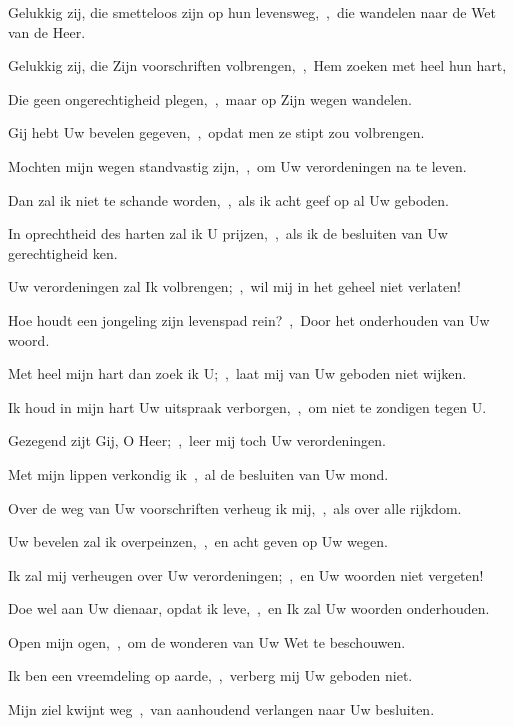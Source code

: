 \documentclass[12pt,twoside,a5paper]{article}
\begin{document}
\begin{halfparskip}

   Gelukkig zij, die smetteloos zijn op hun levensweg,~\sep\ die wandelen naar de Wet van de Heer.


  Gelukkig zij, die Zijn voorschriften volbrengen,~\sep\ Hem zoeken met heel hun hart,

  Die geen ongerechtigheid plegen,~\sep\ maar op Zijn wegen wandelen.

  Gij hebt Uw bevelen gegeven,~\sep\ opdat men ze stipt zou volbrengen.

  Mochten mijn wegen standvastig zijn,~\sep\ om Uw verordeningen na te leven.

  Dan zal ik niet te schande worden,~\sep\ als ik acht geef op al Uw geboden.

  In oprechtheid des harten zal ik U prijzen,~\sep\ als ik de besluiten van Uw gerechtigheid ken.

  Uw verordeningen zal Ik volbrengen;~\sep\ wil mij in het geheel niet verlaten!

   Hoe houdt een jongeling zijn levenspad rein?~\sep\ Door het onderhouden van Uw woord.

  Met heel mijn hart dan zoek ik U;~\sep\ laat mij van Uw geboden niet wijken.

  Ik houd in mijn hart Uw uitspraak verborgen,~\sep\ om niet te zondigen tegen U.

  Gezegend zijt Gij, O Heer;~\sep\ leer mij toch Uw verordeningen.

  Met mijn lippen verkondig ik~\sep\ al de besluiten van Uw mond.

  Over de weg van Uw voorschriften verheug ik mij,~\sep\ als over alle rijkdom.

  Uw bevelen zal ik overpeinzen,~\sep\ en acht geven op Uw wegen.

  Ik zal mij verheugen over Uw verordeningen;~\sep\ en Uw woorden niet vergeten!

   Doe wel aan Uw dienaar, opdat ik leve,~\sep\ en Ik zal Uw woorden onderhouden.

  Open mijn ogen,~\sep\ om de wonderen van Uw Wet te beschouwen.

  Ik ben een vreemdeling op aarde,~\sep\ verberg mij Uw geboden niet.

  Mijn ziel kwijnt weg~\sep\ van aanhoudend verlangen naar Uw besluiten.


\end{halfparskip}
\end{document}
